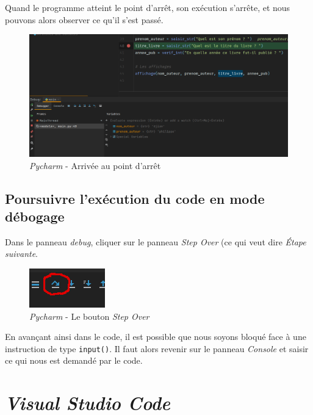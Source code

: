 \documentclass[a4paper,11pt]{book}
\begin{document}
Quand le programme atteint le point d'arrêt, son exécution s'arrête, et nous pouvons alors observer ce qu'il s'est passé.
\begin{figure}[h]
\begin{center}
\includegraphics[scale=0.3]{IMG/Pycharm-07.png}
\caption{\textit{Pycharm} - Arrivée au point d'arrêt}
\end{center}
\end{figure}
\medskip

\subsection*{Poursuivre l'exécution du code en mode débogage}
Dans le panneau \textit{debug}, cliquer sur le panneau \textit{Step Over} (ce qui veut dire \textit{Étape suivante}.
\begin{figure}[h]
\begin{center}
\includegraphics[scale=0.6]{IMG/Pycharm-08.png}
\caption{\textit{Pycharm} - Le bouton \textit{Step Over}}
\end{center}
\end{figure}
\medskip

En avançant ainsi dans le code, il est possible que nous soyons bloqué face à une instruction de type \texttt{input()}. Il faut alors revenir sur le panneau \textit{Console} et saisir ce qui nous est demandé par le code.
\medskip

\section{\textit{Visual Studio Code}}
\end{document}
